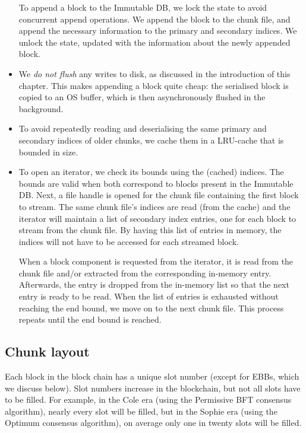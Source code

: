 \begin{itemize}
  To append a block to the Immutable DB, we lock the state to avoid concurrent
  append operations. We append the block to the chunk file, and append the
  necessary information to the primary and secondary indices. We unlock the
  state, updated with the information about the newly appended block.

\item We \emph{do not flush} any writes to disk, as discussed in the
  introduction of this chapter. This makes appending a block quite cheap: the
  serialised block is copied to an OS buffer, which is then asynchronously
  flushed in the background.

\item To avoid repeatedly reading and deserialising the same primary and
  secondary indices of older chunks, we cache them in a LRU-cache that is
  bounded in size.

\item To open an iterator, we check its bounds using the (cached) indices. The
  bounds are valid when both correspond to blocks present in the Immutable DB.
  Next, a file handle is opened for the chunk file containing the first block to
  stream. The same chunk file's indices are read (from the cache) and the
  iterator will maintain a list of secondary index entries, one for each block
  to stream from the chunk file. By having this list of entries in memory, the
  indices will not have to be accessed for each streamed block.

  When a block component is requested from the iterator, it is read from the
  chunk file and/or extracted from the corresponding in-memory entry.
  Afterwards, the entry is dropped from the in-memory list so that the next
  entry is ready to be read. When the list of entries is exhausted without
  reaching the end bound, we move on to the next chunk file. This process
  repeats until the end bound is reached.
\end{itemize}

\subsection{Chunk layout}
\label{immutable:implementation:chunk-layout}

Each block in the block chain has a unique slot number (except for EBBs, which
we discuss below). Slot numbers increase in the blockchain, but not all slots
have to be filled. For example, in the Cole era (using the Permissive BFT
consensus algorithm), nearly every slot will be filled, but in the Sophie era
(using the Optimum consensus algorithm), on average only one in twenty slots will
be filled.

